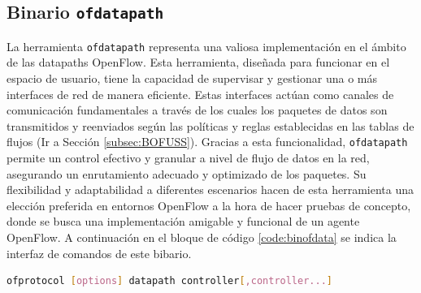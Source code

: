 \subsection{Binario \texttt{ofdatapath}}


La herramienta \texttt{ofdatapath} representa una valiosa implementación en el ámbito de las datapaths OpenFlow. Esta herramienta, diseñada para funcionar en el espacio de usuario, tiene la capacidad de supervisar y gestionar una o más interfaces de red de manera eficiente. Estas interfaces actúan como canales de comunicación fundamentales a través de los cuales los paquetes de datos son transmitidos y reenviados según las políticas y reglas establecidas en las tablas de flujos (Ir a Sección \ref{subsec:BOFUSS}). Gracias a esta funcionalidad, \texttt{ofdatapath} permite un control efectivo y granular a nivel de flujo de datos en la red, asegurando un enrutamiento adecuado y optimizado de los paquetes. Su flexibilidad y adaptabilidad a diferentes escenarios hacen de esta herramienta una elección preferida en entornos OpenFlow a la hora de hacer pruebas de concepto, donde se busca una implementación amigable y funcional de un agente OpenFlow. A continuación en el bloque de código \ref{code:binofdata} se indica la interfaz de comandos de este bibario.\\

\begin{lstlisting}[language= bash, style=Consola, caption={Interfaz CLI del binario ofdatapath},label=code:binofdata]
    ofprotocol [options] datapath controller[,controller...]
\end{lstlisting}
\vspace{0.5cm}

